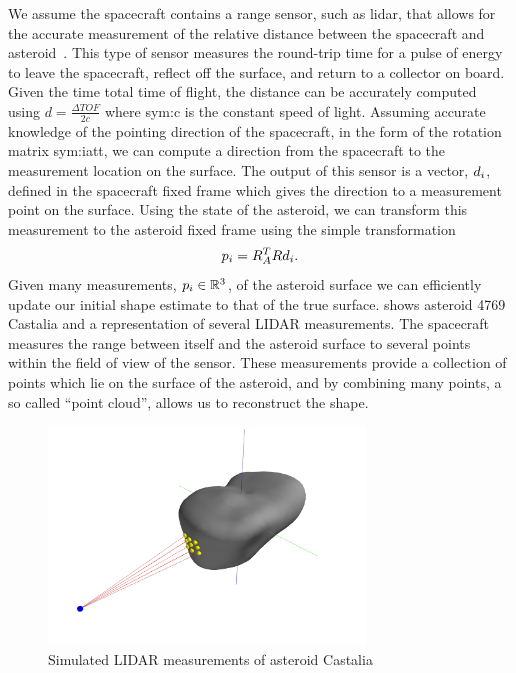 We assume the spacecraft contains a range sensor, such as \gls{lidar}, that allows for the accurate measurement of the relative distance between the spacecraft and asteroid~\cite{zuber1997,zuber2000}.
This type of sensor measures the round-trip time for a pulse of energy to leave the spacecraft, reflect off the surface, and return to a collector on board.
Given the time total time of flight, the distance can be accurately computed using \( d = \frac{\Delta TOF}{2 c} \) where \gls{sym:c} is the constant speed of light.
Assuming accurate knowledge of the pointing direction of the spacecraft, in the form of the rotation matrix \gls{sym:iatt}, we can compute a direction from the spacecraft to the measurement location on the surface.
The output of this sensor is a vector, \( d_i \), defined in the spacecraft fixed frame which gives the direction to a measurement point on the surface. 
Using the state of the asteroid, we can transform this measurement to the asteroid fixed frame using the simple transformation
\begin{align*}
    p_i = R_A^T R d_i .
\end{align*}
Given many measurements, \( p_i \in \mathbb{R}^3 \), of the asteroid surface we can efficiently update our initial shape estimate to that of the true surface.
 shows asteroid 4769 Castalia and a representation of several LIDAR measurements. 
The spacecraft measures the range between itself and the asteroid surface to several points within the field of view of the sensor. 
These measurements provide a collection of points which lie on the surface of the asteroid, and by combining many points, a so called ``point cloud'', allows us to reconstruct the shape.
\begin{figure}
    \centering
    \includegraphics[width=0.75\textwidth]{figures/2018_SSPI/castalia_raycasting_plot.jpg}
    \caption{Simulated LIDAR measurements of asteroid Castalia~\label{fig:lidar_example}}
\end{figure}

